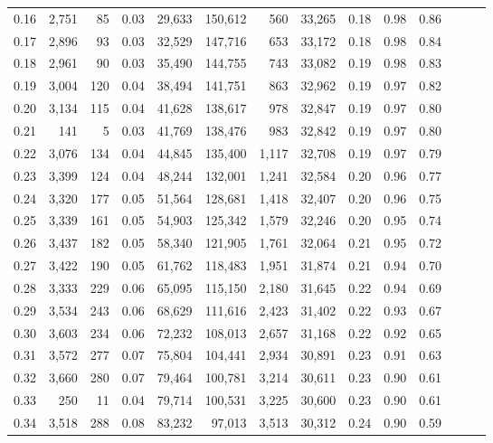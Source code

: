 \begin{tabular}{rrrrrrrrrrrrrr}
0.16 &  2,751 &   85 &  0.03 &   29,633 &  150,612 &     560 &  33,265 &  0.18 &  0.98 &      0.86 \\
0.17 &  2,896 &   93 &  0.03 &   32,529 &  147,716 &     653 &  33,172 &  0.18 &  0.98 &      0.84 \\
0.18 &  2,961 &   90 &  0.03 &   35,490 &  144,755 &     743 &  33,082 &  0.19 &  0.98 &      0.83 \\
0.19 &  3,004 &  120 &  0.04 &   38,494 &  141,751 &     863 &  32,962 &  0.19 &  0.97 &      0.82 \\
0.20 &  3,134 &  115 &  0.04 &   41,628 &  138,617 &     978 &  32,847 &  0.19 &  0.97 &      0.80 \\
0.21 &    141 &    5 &  0.03 &   41,769 &  138,476 &     983 &  32,842 &  0.19 &  0.97 &      0.80 \\
0.22 &  3,076 &  134 &  0.04 &   44,845 &  135,400 &   1,117 &  32,708 &  0.19 &  0.97 &      0.79 \\
0.23 &  3,399 &  124 &  0.04 &   48,244 &  132,001 &   1,241 &  32,584 &  0.20 &  0.96 &      0.77 \\
0.24 &  3,320 &  177 &  0.05 &   51,564 &  128,681 &   1,418 &  32,407 &  0.20 &  0.96 &      0.75 \\
0.25 &  3,339 &  161 &  0.05 &   54,903 &  125,342 &   1,579 &  32,246 &  0.20 &  0.95 &      0.74 \\
0.26 &  3,437 &  182 &  0.05 &   58,340 &  121,905 &   1,761 &  32,064 &  0.21 &  0.95 &      0.72 \\
0.27 &  3,422 &  190 &  0.05 &   61,762 &  118,483 &   1,951 &  31,874 &  0.21 &  0.94 &      0.70 \\
0.28 &  3,333 &  229 &  0.06 &   65,095 &  115,150 &   2,180 &  31,645 &  0.22 &  0.94 &      0.69 \\
0.29 &  3,534 &  243 &  0.06 &   68,629 &  111,616 &   2,423 &  31,402 &  0.22 &  0.93 &      0.67 \\
0.30 &  3,603 &  234 &  0.06 &   72,232 &  108,013 &   2,657 &  31,168 &  0.22 &  0.92 &      0.65 \\
0.31 &  3,572 &  277 &  0.07 &   75,804 &  104,441 &   2,934 &  30,891 &  0.23 &  0.91 &      0.63 \\
0.32 &  3,660 &  280 &  0.07 &   79,464 &  100,781 &   3,214 &  30,611 &  0.23 &  0.90 &      0.61 \\
0.33 &    250 &   11 &  0.04 &   79,714 &  100,531 &   3,225 &  30,600 &  0.23 &  0.90 &      0.61 \\
0.34 &  3,518 &  288 &  0.08 &   83,232 &   97,013 &   3,513 &  30,312 &  0.24 &  0.90 &      0.59 \\

\end{tabular}
